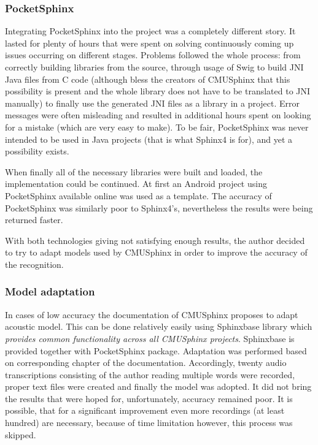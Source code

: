 \subsubsection{PocketSphinx}

Integrating PocketSphinx into the project was a completely different story. It lasted for plenty of hours that were spent on solving  continuously coming up issues occurring on different stages. Problems followed the whole process: from correctly building libraries from the source, through usage of Swig to build JNI Java files from C code (although bless the creators of CMUSphinx that this possibility is present and the whole library does not have to be translated to JNI manually) to finally use the generated JNI files as a library in a project. Error messages were often misleading and resulted in additional hours spent on looking for a mistake (which are very easy to make). To be fair, PocketSphinx was never intended to be used in Java projects (that is what Sphinx4 is for), and yet a possibility exists.

When finally all of the necessary libraries were built and loaded, the implementation could be continued. At first an Android project using PocketSphinx available online was used as a template. The accuracy of PocketSphinx was similarly poor to Sphinx4's, nevertheless the results were being returned faster. 

With both technologies giving not satisfying enough results, the author decided to try to adapt models used by CMUSphinx in order to improve the accuracy of the recognition. 

\subsubsection{Model adaptation}

In cases of low accuracy the documentation of CMUSphinx proposes to adapt acoustic model. This can be done relatively easily using Sphinxbase library which \textit{provides common functionality across all CMUSphinx projects}. Sphinxbase is provided together with PocketSphinx package. Adaptation was performed based on corresponding chapter of the documentation. Accordingly, twenty audio transcriptions consisting of the author reading multiple words were recorded, proper text files were created and finally the model was adopted. It did not bring the results that were hoped for, unfortunately, accuracy remained poor. It is possible, that for a significant improvement even more recordings (at least hundred) are necessary, because of time limitation however, this process was skipped. 

